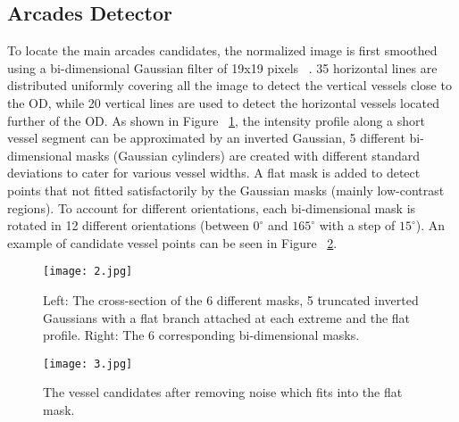 \documentclass[10pt,twocolumn,letterpaper]{article}
\begin{document}
\subsection{Arcades Detector}

To locate the main arcades candidates, the normalized image is first smoothed using a bi-dimensional Gaussian filter of 19x19 pixels ~\cite{Perez2008Robust}. 35 horizontal lines are distributed uniformly covering all the image to detect the vertical vessels close to the OD, while 20 vertical lines are used to detect the horizontal vessels located further of the OD. As shown in Figure ~\ref{fig:twocol}, the intensity profile along a short vessel segment can be approximated by an inverted Gaussian, 5 different bi-dimensional masks (Gaussian cylinders) are created with different standard deviations to cater for various vessel widths. A flat mask is added to detect points that not fitted satisfactorily by the Gaussian masks (mainly low-contrast regions). To account for different orientations, each bi-dimensional mask is rotated in 12 different orientations (between $ 0^\circ $ and $165^\circ $ with a step of $15^\circ$). An example of candidate vessel points can be seen in Figure ~\ref{fig:threecol}.

\begin{figure}[!htpb]
\begin{center}
   \texttt{[image: 2.jpg]}
\end{center}
   \caption{Left: The cross-section of the 6 different masks, 5 truncated inverted Gaussians with a flat branch attached at each extreme and the flat profile. Right: The 6 corresponding bi-dimensional masks.}
\label{fig:twocol}
\end{figure}

\begin{figure}[!htpb]
\begin{center}
   \texttt{[image: 3.jpg]}
\end{center}
   \caption{The vessel candidates after removing noise which fits into the flat mask.}
\label{fig:threecol}
\end{figure}

{\small


}
\end{document}

